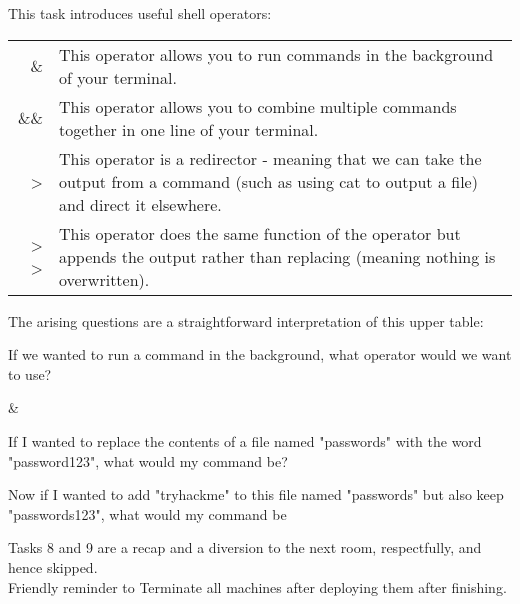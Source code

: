 \begin{task}
This task introduces useful shell operators: 

\begin{tabular}{r|l}
\& & This operator allows you to run commands in the background of your terminal.\\
\&\& & This operator allows you to combine multiple commands together in one line of your terminal.\\
> & This operator is a redirector - meaning that we can take the output from a command (such as using cat to output a file) and direct it elsewhere.\\
> > & This operator does the same function of the \> operator but appends the output rather than replacing (meaning nothing is overwritten).
\end{tabular}

The arising questions are a straightforward interpretation of this upper table:
\begin{question}
If we wanted to run a command in the background, what operator would we want to use? 
\end{question}
\begin{answer}
\&
\end{answer}

\begin{question}
If I wanted to replace the contents of a file named "passwords" with the word "password123", what would my command be?
\end{question}
\begin{answer}
\end{answer}
\begin{question}
Now if I wanted to add "tryhackme" to this file named "passwords" but also keep "passwords123", what would my command be
\end{question}
\begin{answer}
\end{answer}
\end{task}
Tasks 8 and 9 are a recap and a diversion to the next room, respectfully, and hence skipped. \\
Friendly reminder to Terminate all machines after deploying them after finishing. 